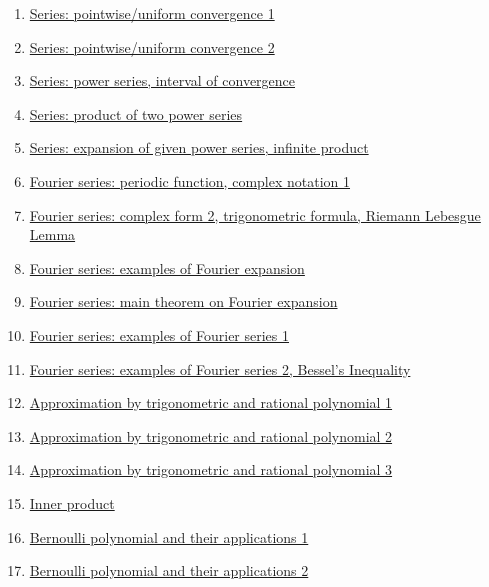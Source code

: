 \documentclass[11pt]{article}
\begin{document}
\begin{enumerate}
	\item \href{https://mp.weixin.qq.com/s/h2Gsu-uxRFgqLk34sHdqGw}{Series: pointwise/uniform convergence 1}	%
	\item \href{https://mp.weixin.qq.com/s/em69T457kgN8DCNOi3MqNw}{Series: pointwise/uniform convergence 2}	%
	\item \href{https://mp.weixin.qq.com/s/C_qWwY9r7Wqquk0Dpq_r5A}{Series: power series, interval of convergence}	%
	\item \href{https://mp.weixin.qq.com/s/FPru75acJ7toOM06Mkq0MQ}{Series: product of two power series}	%
	\item \href{https://mp.weixin.qq.com/s/7D57J6Qic6hNnAjvPPM44w}{Series: expansion of given power series, infinite product}	%
	\item \href{https://mp.weixin.qq.com/s/7UXE-cub3pKSqixYXnsrgQ}{Fourier series: periodic function, complex notation 1}	%
	\item \href{https://mp.weixin.qq.com/s/okK6U1OAHyqWDo9RuUPLPA}{Fourier series: complex form 2, trigonometric formula, Riemann Lebesgue Lemma}	%
	\item \href{https://mp.weixin.qq.com/s/dmb6iMfwGthvqdx37UaLFQ}{Fourier series: examples of Fourier expansion}	%
	\item \href{https://mp.weixin.qq.com/s/SSNRnAP2Ixx-SmtZsjy2jA}{Fourier series: main theorem on Fourier expansion}	%
	\item \href{https://mp.weixin.qq.com/s/s736cBxFxHhcteNPzCochQ}{Fourier series: examples of Fourier series 1}	%
	\item \href{https://mp.weixin.qq.com/s/wtLeeApB45OSev34uW7lGA}{Fourier series: examples of Fourier series 2, Bessel's Inequality}	%
	\item \href{https://mp.weixin.qq.com/s/tfS_J6gQ-1XWo5SVPCNKwA}{Approximation by trigonometric and rational polynomial 1}	%
	\item \href{https://mp.weixin.qq.com/s/rKuvvXPphPKXL1ByORd4cA}{Approximation by trigonometric and rational polynomial 2}	%
	\item \href{https://mp.weixin.qq.com/s/WyY2kuqoDXI0rj4tiVGF9w}{Approximation by trigonometric and rational polynomial 3}	%
	\item \href{https://mp.weixin.qq.com/s/Mt-QnrU7IvwvyLj8MluLLA}{Inner product}	%
	\item \href{https://mp.weixin.qq.com/s/UwOwRipaO1DbHEY-Xl0jLg}{Bernoulli polynomial and their applications 1}	%
	\item \href{https://mp.weixin.qq.com/s/SNKjyVc5iyEtFnqHTbIKSQ}{Bernoulli polynomial and their applications 2}	%
\end{enumerate}
\end{document}
